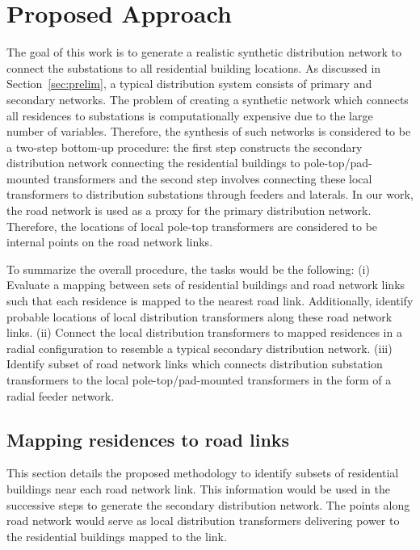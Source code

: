 \documentclass[sigconf]{acmart}
\begin{document}
\section{Proposed Approach}\label{sec:approach}
The goal of this work is to generate a realistic synthetic distribution network to connect the substations to all residential building locations. As discussed in Section~\ref{sec:prelim}, a typical distribution system consists of primary and secondary networks. The problem of creating a synthetic network which connects all residences to substations is computationally expensive due to the large number of variables. Therefore, the synthesis of such networks is considered to be a two-step bottom-up procedure: the first step constructs the secondary distribution network connecting the residential buildings to pole-top/pad-mounted transformers and the second step involves connecting these local transformers to distribution substations through feeders and laterals. In our work, the road network is used as a proxy for the primary distribution network. Therefore, the locations of local pole-top transformers are considered to be internal points on the road network links.

To summarize the overall procedure, the tasks would be the following:
(i) Evaluate a mapping between sets of residential buildings and road network links such that each residence is mapped to the nearest road link. Additionally, identify probable locations of local distribution transformers along these road network links.
(ii)  Connect the local distribution transformers to mapped residences in a radial configuration to resemble a typical secondary distribution network.
(iii) Identify subset of road network links which connects distribution substation transformers to the local pole-top/pad-mounted transformers in the form of a radial feeder network.

\subsection{Mapping residences to road links}\label{ssec:map}
This section details the proposed methodology to identify subsets of residential buildings near each road network link. This information would be used in the successive steps to generate the secondary distribution network. The points along road network would serve as local distribution transformers delivering power to the residential buildings mapped to the link.
\end{document}

